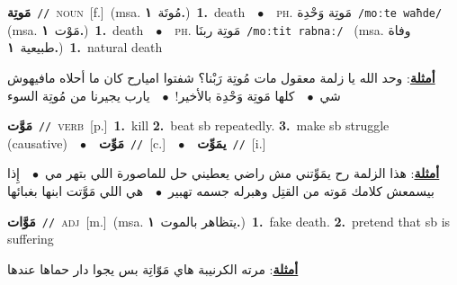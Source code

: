 \documentclass[10pt,a4paper,twoside]{article} %
\begin{document}
\begin{multicols}{2}
{\setlength\topsep{0pt}\textbf{\foreignlanguage{arabic}{مَوتِة}}\ {\color{gray}\texttt{//}\color{black}}\ \textsc{noun}\ [f.]\ \color{gray}(msa. \foreignlanguage{arabic}{مُوتَة}~\foreignlanguage{arabic}{\textbf{١.}})\color{black}\ \textbf{1.}~death\ \ $\bullet$\ \ \textsc{ph.} \color{gray} \foreignlanguage{arabic}{مَوتِة وَحْدِة}\color{black}\ {\color{gray}\texttt{/{\sffamily moːte waħde}/}\color{black}}\ \color{gray} (msa. \foreignlanguage{arabic}{مَوْت}~\foreignlanguage{arabic}{\textbf{١.}})\color{black}\ \textbf{1.}~death\ \ $\bullet$\ \ \textsc{ph.} \color{gray} \foreignlanguage{arabic}{مَوتِة ربنَا}\color{black}\ {\color{gray}\texttt{/{\sffamily moːtit rabnaː}/}\color{black}}\ \color{gray} (msa. \foreignlanguage{arabic}{وفاة طبيعية}~\foreignlanguage{arabic}{\textbf{١.}})\color{black}\ \textbf{1.}~natural death\  \begin{flushright}\color{gray}\foreignlanguage{arabic}{\textbf{\underline{\foreignlanguage{arabic}{أمثلة}}}: وحد الله يا زلمة معقول مات مُوتِة رَبْنا؟ شفتوا اميارح كان ما أحلاه مافيهوش شي\ $\bullet$\ \  كلها مَوتِة وَحْدِة بالأخير!\ $\bullet$\ \  يارب يجيرنا من مُوتِة السوء}\end{flushright}\color{black}} \vspace{2mm}

{\setlength\topsep{0pt}\textbf{\foreignlanguage{arabic}{مَوَّت}}\ {\color{gray}\texttt{//}\color{black}}\ \textsc{verb}\ [p.]\ \textbf{1.}~kill  \textbf{2.}~beat sb repeatedly.  \textbf{3.}~make sb struggle (causative)\ \ $\bullet$\ \ \setlength\topsep{0pt}\textbf{\foreignlanguage{arabic}{مَوِّت}}\ {\color{gray}\texttt{//}\color{black}}\ [c.]\ \ $\bullet$\ \ \setlength\topsep{0pt}\textbf{\foreignlanguage{arabic}{يمَوِّت}}\ {\color{gray}\texttt{//}\color{black}}\ [i.]\  \begin{flushright}\color{gray}\foreignlanguage{arabic}{\textbf{\underline{\foreignlanguage{arabic}{أمثلة}}}: هذا الزلمة رح يمَوِّتني مش راضي يعطيني حل للماصورة اللي بتهر مي\ $\bullet$\ \  إِذا بيسمعش كلامك مَوته من القتِل وهبرله جسمه تهبير\ $\bullet$\ \  هي اللي مَوَّتت ابنها بغبائها}\end{flushright}\color{black}} \vspace{2mm}

{\setlength\topsep{0pt}\textbf{\foreignlanguage{arabic}{مَوَّات}}\ {\color{gray}\texttt{//}\color{black}}\ \textsc{adj}\ [m.]\ \color{gray}(msa. \foreignlanguage{arabic}{يتظاهر بالموت}~\foreignlanguage{arabic}{\textbf{١.}})\color{black}\ \textbf{1.}~fake death.  \textbf{2.}~pretend that sb is suffering\  \begin{flushright}\color{gray}\foreignlanguage{arabic}{\textbf{\underline{\foreignlanguage{arabic}{أمثلة}}}: مرته الكرنيبة هاي مَوّاتِة بس يجوا دار حماها عندها}\end{flushright}\color{black}} \vspace{2mm}


\end{multicols}
\end{document}
